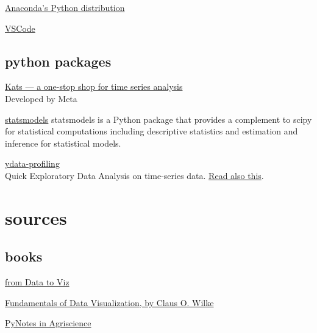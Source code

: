 \documentclass[
  letterpaper,
  DIV=11,
  numbers=noendperiod,
  oneside]{scrreprt}
\begin{document}
\href{https://www.anaconda.com/download}{Anaconda's Python distribution}

\href{https://code.visualstudio.com/download}{VSCode}

\hypertarget{python-packages}{%
\section*{python packages}\label{python-packages}}


\href{https://engineering.fb.com/2021/06/21/open-source/kats/}{Kats ---
a one-stop shop for time series analysis}\\
Developed by Meta

\href{https://www.statsmodels.org/stable/}{statsmodels} statsmodels is a
Python package that provides a complement to scipy for statistical
computations including descriptive statistics and estimation and
inference for statistical models.

\href{https://ydata-profiling.ydata.ai/docs/master/pages/use_cases/time_series_datasets.html}{ydata-profiling}\\
Quick Exploratory Data Analysis on time-series data.
\href{https://towardsdatascience.com/how-to-do-an-eda-for-time-series-cbb92b3b1913}{Read
also this}.


\hypertarget{sources}{%
\chapter*{sources}\label{sources}}


\hypertarget{books}{%
\section*{books}\label{books}}


\href{https://www.data-to-viz.com}{from Data to Viz}

\href{https://clauswilke.com/dataviz/}{Fundamentals of Data
Visualization, by Claus O. Wilke}

\href{https://soilwater.github.io/pynotes-agriscience/intro.html}{PyNotes
in Agriscience}
\end{document}
